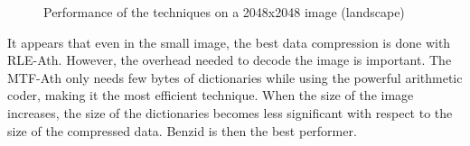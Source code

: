 \begin{figure}[h]
	\vspace*{-0.4cm}
	\centering
	\caption{Performance of the techniques on a 2048x2048 image (landscape)}
	\label{fig:big}
	\vspace*{-0.5cm}
\end{figure}

It appears that even in the small image, the best data compression is done with RLE-Ath. However, the overhead needed to decode the image is important. The MTF-Ath only needs few bytes of dictionaries while using the powerful arithmetic coder, making it the most efficient technique. When the size of the image increases, the size of the dictionaries becomes less significant with respect to the size of the compressed data. Benzid is then the best performer.
